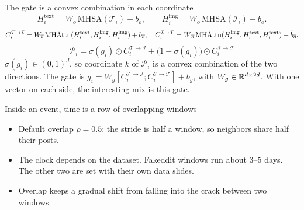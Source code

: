 \begin{frame}{The gate is a convex combination in each coordinate}
  {\small
  \[
    H_i^{\mathrm{text}}=W_o\,\mathrm{MHSA}(\mathcal{T}_i)+b_o,
    \qquad
    H_i^{\mathrm{img}}=\overline{W}_o\,\mathrm{MHSA}(\mathcal{I}_i)+\overline{b}_o.
  \]
  }
  \vspace{-0.2em}
  {\small
  \[
    C_i^{\mathcal{T}\to\mathcal{I}}
      = W_{\overline{o}}\,\mathrm{MHAttn}(H_i^{\mathrm{text}},H_i^{\mathrm{img}},H_i^{\mathrm{img}})+b_{\overline{o}},
    \quad
    C_i^{\mathcal{I}\to\mathcal{T}}
      = \overline{W}_{\overline{o}}\,\mathrm{MHAttn}(H_i^{\mathrm{img}},H_i^{\mathrm{text}},H_i^{\mathrm{text}})+\overline{b}_{\overline{o}}.
  \]}
  \vspace{-0.35em}
  \[
    \mathcal{P}_i
    = \sigma(g_i)\odot C_i^{\mathcal{T}\to\mathcal{I}}
    + \bigl(1-\sigma(g_i)\bigr)\odot C_i^{\mathcal{I}\to\mathcal{T}}
  \]
  {\small
    $\sigma(g_i)\in(0,1)^{d}$, so coordinate $k$ of $\mathcal{P}_i$ is a convex combination of the two directions.
    The gate is $g_i = W_g[C_i^{\mathcal{T}\to\mathcal{I}};C_i^{\mathcal{I}\to\mathcal{T}}]+b_g$, with $W_g\in\mathbb{R}^{d\times 2d}$.
    With one vector on each side, the interesting mix is this gate.}
\end{frame}

\begin{frame}{Inside an event, time is a row of overlapping windows}
  \begin{center}
  \end{center}
  \vspace{0.4em}
  \begin{itemize}
    \item Default overlap $\rho=0.5$: the stride is half a window, so neighbors share half their posts.
    \item The clock depends on the dataset. Fakeddit windows run about 3--5 days. The other two are set with their own data slides.
    \item Overlap keeps a gradual shift from falling into the crack between two windows.
  \end{itemize}
\end{frame}

